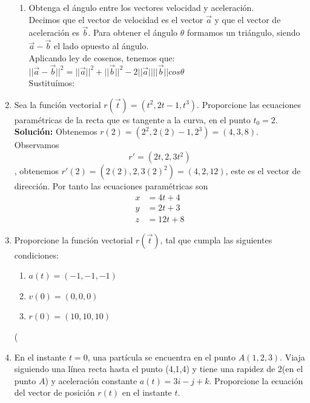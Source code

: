 \documentclass[10pt,letterpaper,fleqn]{article}
\begin{document}
\begin{enumerate}
\begin{enumerate}
            \item Obtenga el ángulo entre los vectores velocidad y aceleración.
            \\ Decimos que el vector de velocidad es el vector $\overrightarrow{a}$ y que el vector de aceleración es $\overrightarrow{b}$. Para obtener el ángulo $\theta$ formamos un triángulo, siendo $\overrightarrow{a}-\overrightarrow{b}$ el lado opuesto al ángulo.
            \\ Aplicando ley de cosenos, tenemos que: \\
            $||\overrightarrow{a}-\overrightarrow{b}||^2=||\overrightarrow{a}||^2 + ||\overrightarrow{b}||^2-2||\overrightarrow{a}|| ||\overrightarrow{b}|| cos \theta $ \\
            Sustituímos: \\
        \end{enumerate}


        \item Sea la función vectorial $r(\overrightarrow{t})=(t^2, 2t-1, t^3)$. Proporcione las ecuaciones paramétricas de
        la recta que es tangente a la curva, en el punto $t_0=2$.\\
        \textbf{Solución:} Obtenemos $r(2)= (2^2,2(2) -1 , 2^3)=(4, 3, 8)$. Observamos $$r' = (2t,2,3t^2)$$, obtenemos
        $r'(2) = (2(2),2,3(2)^2) = (4,2,12)$, este es el vector de dirección. Por tanto las ecuaciones paramétricas son
        \begin{equation*}
        \begin{split}
        	x &= 4t + 4 \\
        	y &= 2t + 3 \\
        	z &= 12t + 8
        \end{split}
        \end{equation*} 

        \item Proporcione la función vectorial $r(\overrightarrow{t})$, tal que cumpla las siguientes condiciones:
        \begin{enumerate}
            \item $a(t)=(-1,-1,-1)$
            \item $v(0)=(0,0,0)$
            \item $r(0)=(10,10,10)$
        \end{enumerate}
(
        \item En el instante $t = 0$, una partícula se encuentra en el punto $A(1,2,3)$. Viaja siguiendo una línea recta
        hasta el punto (4,1,4) y tiene una rapidez de 2(en el punto $A$) y aceleración constante $a(t) = 3i - j + k$.
        Proporcione la ecuación del vector de posición $r(t)$ en el instante $t$.


\end{enumerate}
\end{document}
